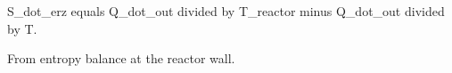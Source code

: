 S_dot_erz equals Q_dot_out divided by T_reactor minus Q_dot_out divided by T.  

From entropy balance at the reactor wall.